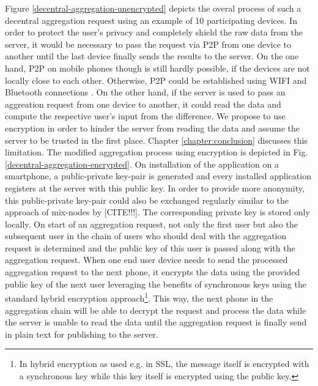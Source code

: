 Figure \ref{decentral-aggregation-unencrypted} depicts the overal process of such a decentral aggregation request using an example of 10 participating devices.
In order to protect the user's privacy and completely shield the raw data from the server, it would be necessary to pass the request via P2P from one device to another until the last device finally sends the results to the server. On the one hand, P2P on mobile phones though is still hardly possible, if the devices are not locally close to each other. Otherwise, P2P could be established using WIFI and Bluetooth connections \parencite{p2p-android}. On the other hand, if the server is used to pass an aggreation request from one device to another, it could read the data and compute the respective user's input from the difference. We propose to use encryption in order to hinder the server from reading the data and assume the server to be trusted in the first place. Chapter \ref{chapter:conclusion} discusses this limitation. The modified aggregation process using encryption is depicted in Fig. \ref{decentral-aggregation-encrypted}. On installation of the application on a smartphone, a public-private key-pair is generated and every installed application registers at the server with this public key. In order to provide more anonymity, this public-private key-pair could also be exchanged regularly similar to the approach of mix-nodes by [CITE!!!]. The corresponding private key is stored only locally. On start of an aggregation request, not only the first user but also the subsequent user in the chain of users who should deal with the aggregation request is determined and the public key of this user is passed along with the aggregation request. When one end user device needs to send the processed aggregation request to the next phone, it encrypts the data using the provided public key of the next user leveraging the benefits of synchronous keys using the standard hybrid encryption approach\footnote{In hybrid encryption as used e.g. in SSL, the message itself is encrypted with a synchronous key while this key itself is encrypted using the public key.}. This way, the next phone in the aggregation chain will be able to decrypt the request and process the data while the server is unable to read the data until the aggregation request is finally send in plain text for publishing to the server. 

